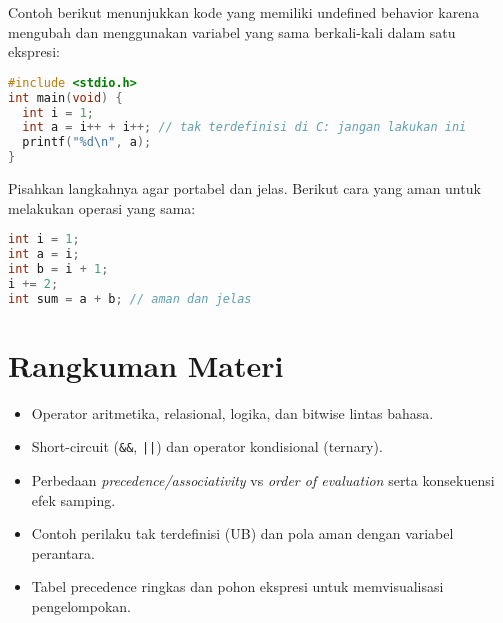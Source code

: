 \documentclass[../main.tex]{subfiles}
\begin{document}
Contoh berikut menunjukkan kode yang memiliki undefined behavior karena mengubah dan menggunakan variabel yang sama berkali-kali dalam satu ekspresi:

\begin{lstlisting}[language=C, caption={Contoh UB: increment dan penggunaan berulang}]
#include <stdio.h>
int main(void) {
  int i = 1;
  int a = i++ + i++; // tak terdefinisi di C: jangan lakukan ini
  printf("%d\n", a);
}
\end{lstlisting}

Pisahkan langkahnya agar portabel dan jelas. Berikut cara yang aman untuk melakukan operasi yang sama:

\begin{lstlisting}[language=C]
int i = 1;
int a = i;
int b = i + 1;
i += 2;
int sum = a + b; // aman dan jelas
\end{lstlisting}

\section{Rangkuman Materi}
\begin{itemize}
  \item Operator aritmetika, relasional, logika, dan bitwise lintas bahasa.
  \item Short-circuit (\texttt{\&\&}, \texttt{||}) dan operator kondisional (ternary).
  \item Perbedaan \emph{precedence/associativity} vs \emph{order of evaluation} serta konsekuensi efek samping.
  \item Contoh perilaku tak terdefinisi (UB) dan pola aman dengan variabel perantara.
  \item Tabel precedence ringkas dan pohon ekspresi untuk memvisualisasi pengelompokan.
\end{itemize}
\end{document}
